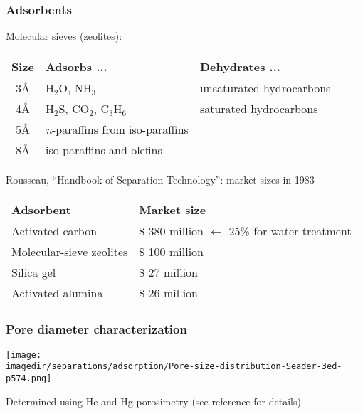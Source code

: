 \begin{frame}\frametitle{Adsorbents}
	Molecular sieves (zeolites):
	
	\begin{tabular}{cll}\\
		\textbf{Size}	&	\textbf{Adsorbs} ... 					&	\textbf{Dehydrates} ...\vspace{6pt}\\ \hline 
		3\AA			&	$\text{H}_2\text{O}$, $\text{NH}_3$		& 	unsaturated hydrocarbons\\
		4\AA			&  	$\text{H}_2\text{S}$, $\text{CO}_2$, $\text{C}_3\text{H}_6$		& 	saturated hydrocarbons\\
		5\AA			&	\emph{n}-paraffins from iso-paraffins   & \\
		8\AA			& 	iso-paraffins and olefins				&	\\
	\end{tabular}
	\vspace{12pt}

	\vspace{12pt}
	Rousseau, ``Handbook of Separation Technology'': {\scriptsize market sizes in 1983}

	\begin{tabular}{ll}\\
		\textbf{Adsorbent}				&	\textbf{Market size} \vspace{6pt}\\ \hline 
			Activated carbon 			&	\$ 380 million $\longleftarrow$ 25\% for water treatment \\
			Molecular-sieve zeolites 	&	\$ 100 million  \\
			Silica gel					&	\$ 27 million  \\
			Activated alumina			&	\$ 26 million
	\end{tabular}
\end{frame}

\begin{frame}\frametitle{Pore diameter characterization}
	\begin{center}
		\texttt{[image: \\imagedir/separations/adsorption/Pore-size-distribution-Seader-3ed-p574.png]}
	\end{center}
	{\scriptsize Determined using He and Hg porosimetry (see reference for details)}
\end{frame}

